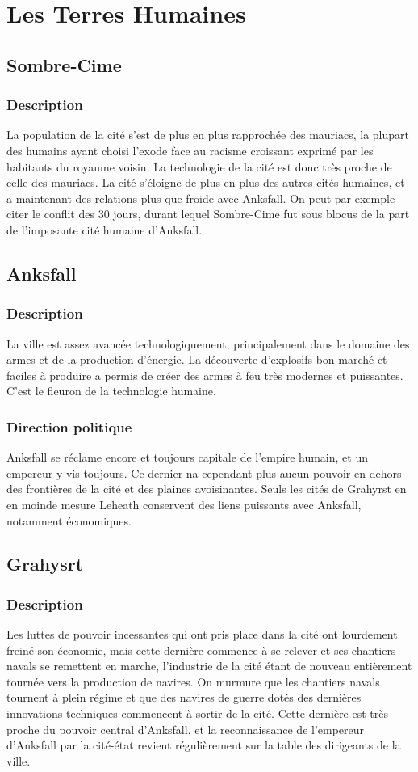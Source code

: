 \section{Les Terres Humaines}
\subsection{Sombre-Cime}
\subsubsection{Description}
La population de la cité s'est de plus en plus rapprochée des mauriacs, la plupart des humains ayant choisi l'exode face au racisme croissant exprimé par les habitants du royaume voisin. La technologie de la cité est donc très proche de celle des mauriacs. La cité s'éloigne de plus en plus des autres cités humaines, et a maintenant des relations plus que froide avec Anksfall. On peut par exemple citer le conflit des 30 jours, durant lequel Sombre-Cime fut sous blocus de la part de l'imposante cité humaine d'Anksfall.
\subsection{Anksfall}
\subsubsection{Description}
La ville est assez avancée technologiquement, principalement dans le domaine des armes et de la production d'énergie. La découverte d'explosifs bon marché et faciles à produire a permis de créer des armes à feu très modernes et puissantes. C'est le fleuron de la technologie humaine.
\subsubsection{Direction politique}
Anksfall se réclame encore et toujours capitale de l'empire humain, et un empereur y vis toujours. Ce dernier na cependant plus aucun pouvoir en dehors des frontières de la cité et des plaines avoisinantes. Seuls les cités de Grahyrst en en moinde mesure Leheath conservent des liens puissants avec Anksfall, notamment économiques.
\subsection{Grahysrt}
\subsubsection{Description}
Les luttes de pouvoir incessantes qui ont pris place dans la cité ont lourdement freiné son économie, mais cette dernière commence à se relever et ses chantiers navals se remettent en marche, l'industrie de la cité étant de nouveau entièrement tournée vers la production de navires. On murmure que les chantiers navals tournent à plein régime et que des navires de guerre dotés des dernières innovations techniques commencent à sortir de la cité. Cette dernière est très proche du pouvoir central d'Anksfall, et la reconnaissance de l'empereur d'Anksfall par la cité-état revient régulièrement sur la table des dirigeants de la ville.
